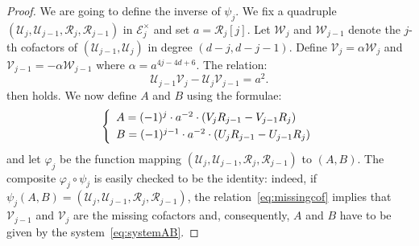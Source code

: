 \documentclass{article}
\begin{document}
\begin{proof} 
We are going to define the inverse of $\psi_j$. We fix a quadruple 
$(\mathcal U_j, \mathcal U_{j-1}, \mathcal R_j, \mathcal R_{j-1})$ in 
$\mathcal E_j^\times$ and set $a = \mathcal R_j[j]$.
Let $\mathcal W_j$ and $\mathcal W_{j-1}$ denote 
the $j$-th cofactors of $(\mathcal U_{j-1}, \mathcal U_j)$ in degree 
$(d{-}j, d{-}j{-}1)$. Define $\mathcal V_j = \alpha \mathcal W_j$ and 
$\mathcal V_{j-1} = -\alpha \mathcal W_{j-1}$ where $\alpha =
a^{4j-4d+6}$. The relation:
\begin{equation}
\label{eq:missingcof}
\mathcal U_{j-1} \mathcal V_j - 
\mathcal U_j \mathcal V_{j-1} = a^2.
\end{equation}
then holds. We now define $A$ and $B$ using the formulae:
\begin{equation}
\label{eq:systemAB}
\left\{\begin{array}{l}
A = (-1)^j \cdot a^{-2} \cdot (V_j R_{j-1} - V_{j-1} R_j) \smallskip \\
B = (-1)^{j-1} \cdot a^{-2} \cdot (U_j R_{j-1} - U_{j-1} R_j) \\
\end{array}\right.
\end{equation}
and let $\varphi_j$ be the function mapping $(\mathcal U_j, \mathcal 
U_{j-1}, \mathcal R_j, \mathcal R_{j-1})$ to $(A,B)$. The composite 
$\varphi_j \circ \psi_j$ is easily checked to be the identity: indeed, 
if $\psi_j(A,B) = (\mathcal U_j, \mathcal U_{j-1}, \mathcal R_j, 
\mathcal R_{j-1})$, the relation~\eqref{eq:missingcof} implies that 
$\mathcal V_{j-1}$ and $\mathcal V_j$ are the missing cofactors and, 
consequently, $A$ and $B$ have to be given by the 
system~\eqref{eq:systemAB}.


\end{proof}
\end{document}
